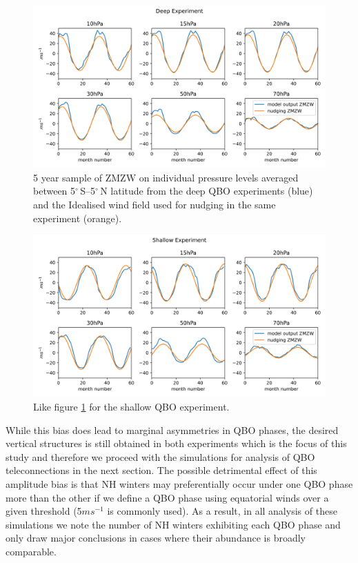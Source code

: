 \begin{figure}[h!]
\begin{center}
\noindent\includegraphics[width = 0.95\linewidth]{Figures/Figures-deepQBO/winds_on_lev_nudging_deep.png}
\caption[Equatorial ZMZW and nudging winds from the deep QBO]{5 year sample of ZMZW on individual pressure levels averaged between 5$^{\circ}$\,S--5$^{\circ}$\,N latitude from the deep QBO experiments (blue) and the Idealised wind field used for nudging in the same experiment (orange).}
\label{fig:winds_on_levs_deep}
\end{center}
\end{figure}

\begin{figure}[h!]
\begin{center}
\noindent\includegraphics[width = 0.95\linewidth]{Figures/Figures-deepQBO/winds_on_lev_nudging_shallow.png}
\caption[Equatorial ZMZW and nudging winds from the shallow QBO]{Like figure \ref{fig:winds_on_levs_deep} for the shallow QBO experiment.}
\label{fig:winds_on_levs_shallow}
\end{center}
\end{figure}

While this bias does lead to marginal asymmetries in QBO phases, the desired vertical structures is still obtained in both experiments which is the focus of this study and therefore we proceed with the simulations for analysis of QBO teleconnections in the next section. The possible detrimental effect of this amplitude bias is that NH winters may preferentially occur under one QBO phase more than the other if we define a QBO phase using equatorial winds over a given threshold (5$ms^{-1}$ is commonly used). As a result, in all analysis of these simulations we note the number of NH winters exhibiting each QBO phase and only draw major conclusions in cases where their abundance is broadly comparable. 

